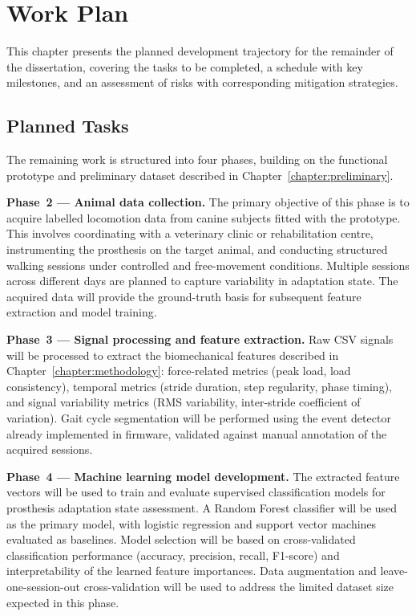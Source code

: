 \chapter{Work Plan}
\label{chapter:workplan}

This chapter presents the planned development trajectory for the remainder of
the dissertation, covering the tasks to be completed, a schedule with key
milestones, and an assessment of risks with corresponding mitigation strategies.

\section{Planned Tasks}
\label{section:tasks}

The remaining work is structured into four phases, building on the functional
prototype and preliminary dataset described in Chapter~\ref{chapter:preliminary}.

\textbf{Phase~2 — Animal data collection.}
The primary objective of this phase is to acquire labelled locomotion data
from canine subjects fitted with the prototype.
This involves coordinating with a veterinary clinic or rehabilitation centre,
instrumenting the prosthesis on the target animal, and conducting structured
walking sessions under controlled and free-movement conditions.
Multiple sessions across different days are planned to capture variability
in adaptation state.
The acquired data will provide the ground-truth basis for subsequent
feature extraction and model training.

\textbf{Phase~3 — Signal processing and feature extraction.}
Raw CSV signals will be processed to extract the biomechanical features
described in Chapter~\ref{chapter:methodology}: force-related metrics
(peak load, load consistency), temporal metrics (stride duration, step
regularity, phase timing), and signal variability metrics (RMS variability,
inter-stride coefficient of variation).
Gait cycle segmentation will be performed using the event detector already
implemented in firmware, validated against manual annotation of the
acquired sessions.

\textbf{Phase~4 — Machine learning model development.}
The extracted feature vectors will be used to train and evaluate supervised
classification models for prosthesis adaptation state assessment.
A Random Forest classifier will be used as the primary model, with logistic
regression and support vector machines evaluated as baselines.
Model selection will be based on cross-validated classification performance
(accuracy, precision, recall, F1-score) and interpretability of the learned
feature importances.
Data augmentation and leave-one-session-out cross-validation will be used to
address the limited dataset size expected in this phase.

